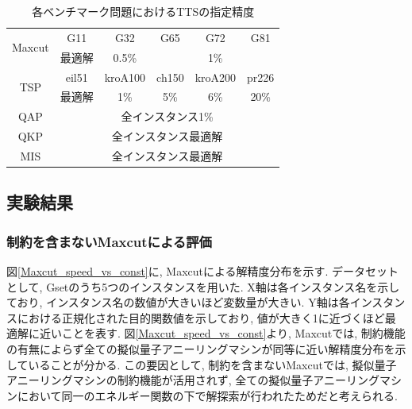 \documentclass[submit,techrep,noauthor]{ipsj}
\begin{document}
\begin{table}[tb]
\centering
  \caption{各ベンチマーク問題におけるTTSの指定精度}
    \begin{tabular}{|c||c|c|c|c|c|}
      \hline
      \multirow{2}{*}{Maxcut} & G11 & G32 & G65 & G72 & G81\\
      \cline{2-2} \cline{3-3} \cline{4-4} \cline{5-5} \cline{6-6}
                              & 最適解 & 0.5\% & \multicolumn{3}{|c|}{1\%}\\ \hline
      \multirow{2}{*}{TSP} & eil51 & kroA100 & ch150 & kroA200 & pr226\\
      \cline{2-2} \cline{3-3} \cline{4-4} \cline{5-5} \cline{6-6}
                              & 最適解 & 1\% & 5\% & 6\% & 20\%\\ \hline
      QAP                     & \multicolumn{5}{|c|}{全インスタンス1\%}\\ \hline
      QKP                     & \multicolumn{5}{|c|}{全インスタンス最適解}\\ \hline
      MIS                     & \multicolumn{5}{|c|}{全インスタンス最適解}\\ \hline
    \end{tabular}
\label{table_target}
\end{table}

\subsection{実験結果}

\subsubsection{制約を含まないMaxcutによる評価}
図\ref{Maxcut_speed_vs_const}に, Maxcutによる解精度分布を示す. データセットとして, Gset\cite{gset}のうち5つのインスタンスを用いた. X軸は各インスタンス名を示しており, インスタンス名の数値が大きいほど変数量が大きい. Y軸は各インスタンスにおける正規化された目的関数値を示しており, 値が大きく1に近づくほど最適解に近いことを表す. 図\ref{Maxcut_speed_vs_const}より, Maxcutでは, 制約機能の有無によらず全ての擬似量子アニーリングマシンが同等に近い解精度分布を示していることが分かる. この要因として, 制約を含まないMaxcutでは, 擬似量子アニーリングマシンの制約機能が活用されず, 全ての擬似量子アニーリングマシンにおいて同一のエネルギー関数の下で解探索が行われたためだと考えられる.
\end{document}
